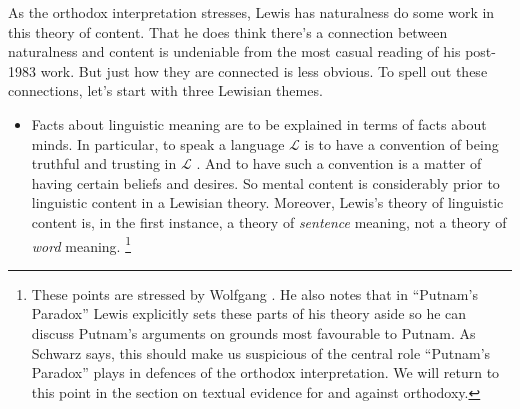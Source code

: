 As the orthodox interpretation stresses, Lewis has naturalness do some work in this theory of content. That he does think there's a connection between naturalness and content is undeniable from the most casual reading of his post-1983 work. But just how they are connected is less obvious. To spell out these connections, let's start with three Lewisian themes.

\begin{itemize}
\item Facts about linguistic meaning are to be explained in terms of facts about minds. In particular, to speak a language $\mathcal{L}$ is to have a convention of being truthful and trusting in $\mathcal{L}$ \citep{Lewis1969a, Lewis1975b}. And to have such a convention is a matter of having certain beliefs and desires. So mental content is considerably prior to linguistic content in a Lewisian theory. Moreover, Lewis's theory of linguistic content is, in the first instance, a theory of \textit{sentence} meaning, not a theory of \textit{word} meaning.%
\footnote{These points are stressed by Wolfgang \citet{Schwarz2006, Schwarz2009}. He also notes that in ``Putnam's Paradox'' Lewis explicitly sets these parts of his theory aside so he can discuss Putnam's arguments on grounds most favourable to Putnam. As Schwarz says, this should make us suspicious of the central role ``Putnam's Paradox'' plays in defences of the orthodox interpretation. We will return to this point in the section on textual evidence for and against orthodoxy.

}
\end{itemize}
